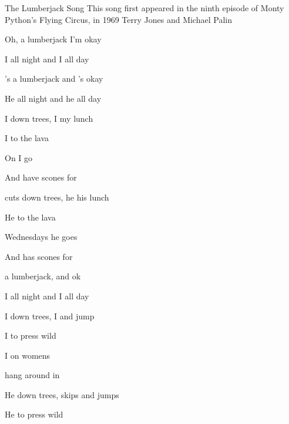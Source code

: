 \begin{SBSong}{The Lumberjack Song}
  {This song first appeared in the ninth episode of Monty Python's Flying Circus, in 1969}
  {Terry Jones and Michael Palin}
  \begin{SBVerse}
    Oh,  a lumberjack  I'm okay
    
    I  all night and I  all day
  \end{SBVerse}
  \begin{SBVerse}
    's a lumberjack and 's okay
    
    He  all night and he  all day
  \end{SBVerse}
  \begin{SBVerse}
    I  down trees, I  my lunch
    
    I  to the lava
    
    On  I go 
    
    And have  scones  for  
  \end{SBVerse}
  \begin{SBVerse}
     cuts down trees, he  his lunch
    
    He  to the lava
    
     Wednesdays he goes 
    
    And has  scones  for  
  \end{SBVerse}
  \begin{SBVerse}
     a lumberjack, and  ok
    
    I  all night and I  all day
    
    I  down trees, I  and jump
    
    I  to press wild
    
    I  on womens 
    
     hang around in 
  \end{SBVerse}
  \CBPageBrk
  \begin{SBVerse}
    He  down trees,  skips and jumps
    
    He  to press wild
    

\end{SBVerse}
\end{SBSong}
